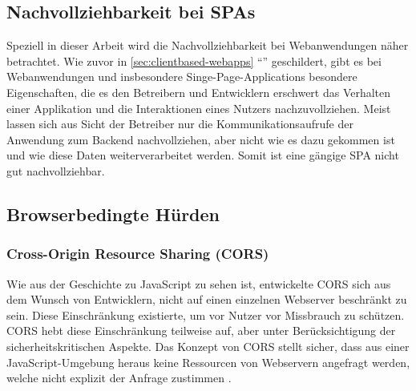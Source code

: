 \subsection{Nachvollziehbarkeit bei SPAs}

Speziell in dieser Arbeit wird die Nachvollziehbarkeit bei Webanwendungen näher betrachtet. Wie zuvor in \autoref{sec:clientbased-webapps} \enquote{} geschildert, gibt es bei Webanwendungen und insbesondere Singe-Page-Applications besondere Eigenschaften, die es den Betreibern und Entwicklern erschwert das Verhalten einer Applikation und die Interaktionen eines Nutzers nachzuvollziehen. Meist lassen sich aus Sicht der Betreiber nur die Kommunikationsaufrufe der Anwendung zum Backend nachvollziehen, aber nicht wie es dazu gekommen ist und wie diese Daten weiterverarbeitet werden. Somit ist eine gängige SPA nicht gut nachvollziehbar.
	


\subsection{Browserbedingte Hürden}


\subsubsection{Cross-Origin Resource Sharing (CORS)}

Wie aus der Geschichte zu JavaScript zu sehen ist, entwickelte CORS sich aus dem Wunsch von Entwicklern, nicht auf einen einzelnen Webserver beschränkt zu sein. Diese Einschränkung existierte, um vor Nutzer vor Missbrauch zu schützen. CORS hebt diese Einschränkung teilweise auf, aber unter Berücksichtigung der sicherheitskritischen Aspekte. Das Konzept von CORS stellt sicher, dass aus einer JavaScript-Umgebung heraus keine Ressourcen von Webservern angefragt werden, welche nicht explizit der Anfrage zustimmen \cite{MDNCORS}.

